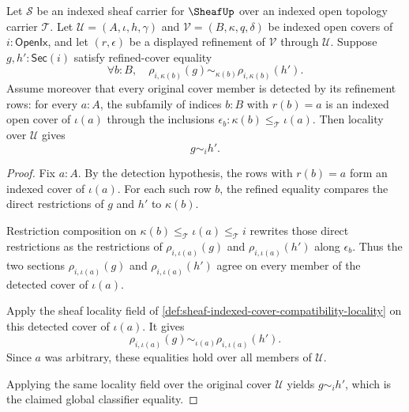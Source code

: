 \begin{theorem}
\label{thm:sheaf-refinement-locality-detection}
Let $\mathcal{S}$ be an indexed sheaf carrier for $\SheafUp$ over an indexed open topology carrier $\mathcal{T}$. Let $\mathcal{U}=(A,\iota,h,\gamma)$ and $\mathcal{V}=(B,\kappa,q,\delta)$ be indexed open covers of $i:\mathsf{OpenIx}$, and let $(r,\epsilon)$ be a displayed refinement of $\mathcal{V}$ through $\mathcal{U}$. Suppose $g,h':\mathsf{Sec}(i)$ satisfy refined-cover equality
$$
\forall b:B,\quad \rho_{i,\kappa(b)}(g)\sim_{\kappa(b)}\rho_{i,\kappa(b)}(h').
$$
Assume moreover that every original cover member is detected by its refinement rows: for every $a:A$, the subfamily of indices $b:B$ with $r(b)=a$ is an indexed open cover of $\iota(a)$ through the inclusions $\epsilon_b:\kappa(b)\le_{\mathcal{T}}\iota(a)$. Then locality over $\mathcal{U}$ gives
$$
g\sim_i h'.
$$
\end{theorem}
\begin{proof}
Fix $a:A$. By the detection hypothesis, the rows with $r(b)=a$ form an indexed cover of $\iota(a)$. For each such row $b$, the refined equality compares the direct restrictions of $g$ and $h'$ to $\kappa(b)$.

Restriction composition on $\kappa(b)\le_{\mathcal{T}}\iota(a)\le_{\mathcal{T}}i$ rewrites those direct restrictions as the restrictions of $\rho_{i,\iota(a)}(g)$ and $\rho_{i,\iota(a)}(h')$ along $\epsilon_b$. Thus the two sections $\rho_{i,\iota(a)}(g)$ and $\rho_{i,\iota(a)}(h')$ agree on every member of the detected cover of $\iota(a)$.

Apply the sheaf locality field of \autoref{def:sheaf-indexed-cover-compatibility-locality} on this detected cover of $\iota(a)$. It gives
$$
\rho_{i,\iota(a)}(g)\sim_{\iota(a)}\rho_{i,\iota(a)}(h').
$$
Since $a$ was arbitrary, these equalities hold over all members of $\mathcal{U}$.

Applying the same locality field over the original cover $\mathcal{U}$ yields $g\sim_i h'$, which is the claimed global classifier equality.
\end{proof}

